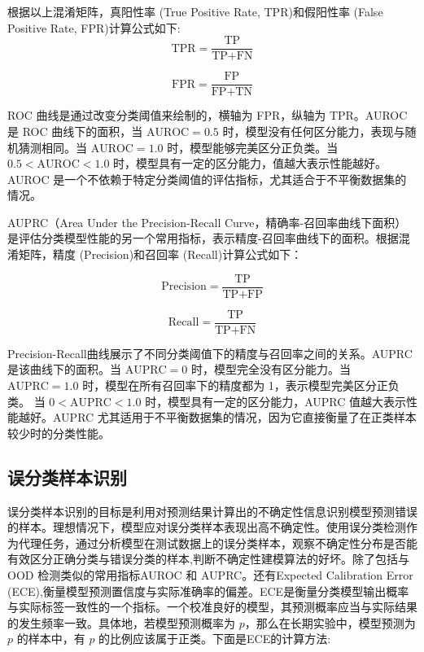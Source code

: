 根据以上混淆矩阵，真阳性率 (True Positive Rate, TPR)和假阳性率 (False Positive Rate, FPR)计算公式如下:
\[
\text{TPR} = \frac{\text{TP}}{\text{TP} + \text{FN}}
\]

\[
\text{FPR} = \frac{\text{FP}}{\text{FP} + \text{TN}}
\]

ROC 曲线是通过改变分类阈值来绘制的，横轴为 FPR，纵轴为 TPR。AUROC 是 ROC 曲线下的面积，当 \(\text{AUROC} = 0.5\) 时，模型没有任何区分能力，表现与随机猜测相同。当 \(\text{AUROC} = 1.0\) 时，模型能够完美区分正负类。当 \(0.5 < \text{AUROC} < 1.0\) 时，模型具有一定的区分能力，值越大表示性能越好。AUROC 是一个不依赖于特定分类阈值的评估指标，尤其适合于不平衡数据集的情况。

AUPRC（Area Under the Precision-Recall Curve，精确率-召回率曲线下面积）是评估分类模型性能的另一个常用指标，表示精度-召回率曲线下的面积。根据混淆矩阵，精度 (Precision)和召回率 (Recall)计算公式如下：

\[
\text{Precision} = \frac{\text{TP}}{\text{TP} + \text{FP}}
\]


\[
\text{Recall} = \frac{\text{TP}}{\text{TP} + \text{FN}}
\]



Precision-Recall曲线展示了不同分类阈值下的精度与召回率之间的关系。AUPRC 是该曲线下的面积。当 \(\text{AUPRC} = 0\) 时，模型完全没有区分能力。当 \(\text{AUPRC} = 1.0\) 时，模型在所有召回率下的精度都为 1，表示模型完美区分正负类。
当 \(0 < \text{AUPRC} < 1.0\) 时，模型具有一定的区分能力，AUPRC 值越大表示性能越好。AUPRC 尤其适用于不平衡数据集的情况，因为它直接衡量了在正类样本较少时的分类性能。




\subsection{误分类样本识别}


误分类样本识别的目标是利用对预测结果计算出的不确定性信息识别模型预测错误的样本。理想情况下，模型应对误分类样本表现出高不确定性。使用误分类检测作为代理任务，通过分析模型在测试数据上的误分类样本，观察不确定性分布是否能有效区分正确分类与错误分类的样本,判断不确定性建模算法的好坏。除了包括与OOD 检测类似的常用指标AUROC 和 AUPRC。还有Expected Calibration Error (ECE)\cite{guo2017calibration},衡量模型预测置信度与实际准确率的偏差。ECE是衡量分类模型输出概率与实际标签一致性的一个指标。一个校准良好的模型，其预测概率应当与实际结果的发生频率一致。具体地，若模型预测概率为 \( p \)，那么在长期实验中，模型预测为 \( p \) 的样本中，有 \( p \) 的比例应该属于正类。下面是ECE的计算方法:


